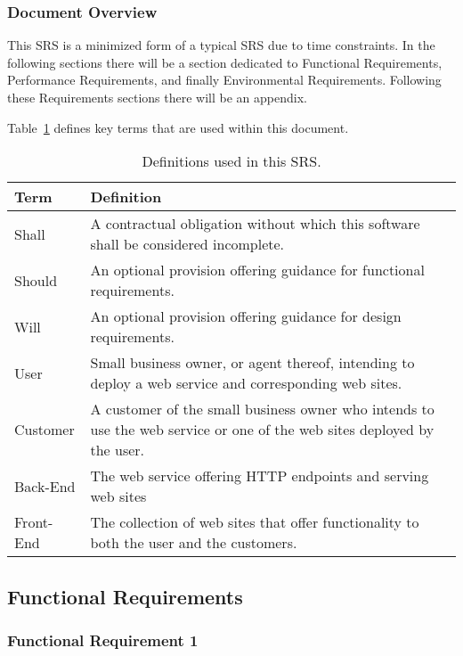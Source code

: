\documentclass{article}
\begin{document}
\subsubsection{Document Overview}

This SRS is a minimized form of a typical SRS due to time constraints.  In the
following sections there will be a section dedicated to Functional Requirements,
Performance Requirements, and finally Environmental Requirements.  Following these
Requirements sections there will be an appendix.

Table~\ref{terms} defines key terms that are used within this document.

\begin{table}
\begin{tabular}{|l|l|}\hline
Term & Definition \\\hline\hline
Shall & A contractual obligation without which this software shall be considered incomplete. \\\hline
Should & An optional provision offering guidance for functional requirements. \\\hline
Will & An optional provision offering guidance for design requirements. \\\hline
User & Small business owner, or agent thereof, intending to deploy a web service
and corresponding web sites. \\\hline
Customer & A customer of the small business owner who intends to use the web service
or one of the web sites deployed by the user. \\\hline
Back-End & The web service offering HTTP endpoints and serving web sites \\\hline
Front-End & The collection of web sites that offer functionality to both the user
and the customers. \\\hline
\end{tabular}
\caption{Definitions used in this SRS.}
\label{terms}
\end{table}

\subsection{Functional Requirements}

\subsubsection{Functional Requirement 1}
\end{document}
